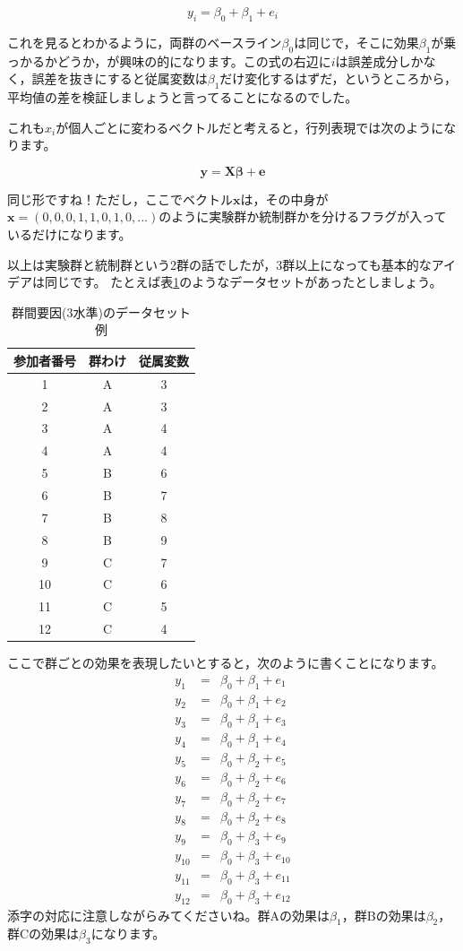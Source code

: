 \documentclass{ltjsbook}
\begin{document}
\[ y_i = \beta_0 + \beta_1 + e_i \]

これを見るとわかるように，両群のベースライン$\beta_0$は同じで，そこに効果$\beta_1$が乗っかるかどうか，が興味の的になります。この式の右辺に$i$は誤差成分しかなく，誤差を抜きにすると従属変数は$\beta_1$だけ変化するはずだ，というところから，平均値の差を検証しましょうと言ってることになるのでした。

これも$x_i$が個人ごとに変わるベクトルだと考えると，行列表現では次のようになります。

\[ \bm{y} = \bm{X\beta} + \bm{e} \]

同じ形ですね！ただし，ここでベクトル$\bm{x}$は，その中身が$\bm{x} = ( 0,0,0,1,1,0,1,0,...)$のように実験群か統制群かを分けるフラグが入っているだけになります。

以上は実験群と統制群という2群の話でしたが，3群以上になっても基本的なアイデアは同じです。
たとえば表\ref{tbl::07_01}のようなデータセットがあったとしましょう。
\begin{table}[ht]
	\centering
	\caption{群間要因(3水準)のデータセット例}
	\begin{tabular}{ccc}
		参加者番号 & 群わけ & 従属変数 \\\hline
		1     & A   & 3    \\
		2     & A   & 3    \\
		3     & A   & 4    \\
		4     & A   & 4    \\
		5     & B   & 6    \\
		6     & B   & 7    \\
		7     & B   & 8    \\
		8     & B   & 9    \\
		9     & C   & 7    \\
		10    & C   & 6    \\
		11    & C   & 5    \\
		12    & C   & 4    \\\hline
	\end{tabular}
	\label{tbl::07_01}
\end{table}

ここで群ごとの効果を表現したいとすると，次のように書くことになります。
\begin{eqnarray*}
	y_1 &=& \beta_0 + \beta_1 + e_1 \\
	y_2 &=& \beta_0 + \beta_1 + e_2 \\
	y_3 &=& \beta_0 + \beta_1 + e_3 \\
	y_4 &=& \beta_0 + \beta_1 + e_4 \\
	y_5 &=& \beta_0 + \beta_2 + e_5 \\
	y_6 &=& \beta_0 + \beta_2 + e_6 \\
	y_7 &=& \beta_0 + \beta_2 + e_7 \\
	y_8 &=& \beta_0 + \beta_2 + e_8 \\
	y_9 &=& \beta_0 + \beta_3 + e_9 \\
	y_{10} &=& \beta_0 + \beta_3 + e_{10} \\
	y_{11} &=& \beta_0 + \beta_3 + e_{11} \\
	y_{12} &=& \beta_0 + \beta_3 + e_{12}
\end{eqnarray*}
添字の対応に注意しながらみてくださいね。群Aの効果は$\beta_1$，群Bの効果は$\beta_2$，群Cの効果は$\beta_3$になります。
\end{document}

